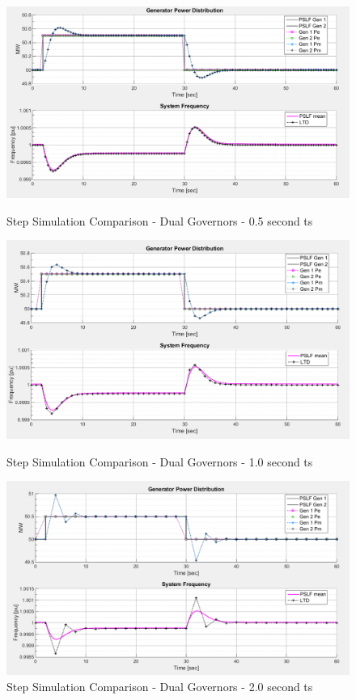 \documentclass[12pt]{article}
\begin{document}
	\begin{figure}[ht!]
	\begin{center}

		\includegraphics[width=.75\linewidth]{2gov_PSLF_comparison01}  \vspace{-1em}
		\caption{Step Simulation Comparison - Dual Governors - 0.5 second ts}
		\label{2gov1}\vspace{1em}
		
		\includegraphics[width=.75\linewidth]{2gov_PSLF_comparison02}  \vspace{-1em}
		\caption{Step Simulation Comparison - Dual Governors - 1.0 second ts}
		\label{2gov2}\vspace{1em}
		
		\includegraphics[width=.75\linewidth]{2gov_PSLF_comparison03}  \vspace{-1em}
		\caption{Step Simulation Comparison - Dual Governors - 2.0 second ts}
		\label{2gov3}\vspace{1em}
		
		
	\end{center}
\end{figure}
\end{document}
